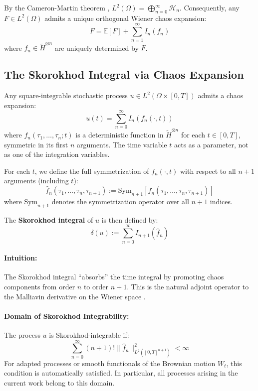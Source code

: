 \documentclass[11pt]{article}
\begin{document}
By the Cameron-Martin theorem \citep{cameron1944transformations}, $L^2(\Omega) = \bigoplus_{n=0}^{\infty} \mathcal{H}_n$. Consequently, any $F \in L^2(\Omega)$ admits a unique orthogonal Wiener chaos expansion:
\begin{equation}
    F = \mathbb{E}[F] + \sum_{n=1}^{\infty} I_n(f_n)
\end{equation}
where $f_n \in \tilde{H}^{\otimes n}$ are uniquely determined by $F$.

\subsection{The Skorokhod Integral via Chaos Expansion}\label{sec:Skorokhod}

Any square-integrable stochastic process $u \in L^2(\Omega \times [0,T])$ admits a chaos expansion:
\begin{equation}
    u(t) = \sum_{n=0}^{\infty} I_n(f_n(\cdot, t))
\end{equation}
where $f_n(\tau_1, \ldots, \tau_n; t)$ is a deterministic function in $\tilde{H}^{\otimes n}$ for each $t \in [0,T]$, symmetric in its first $n$ arguments. The time variable $t$ acts as a parameter, not as one of the integration variables.

For each $t$, we define the full symmetrization of $f_n(\cdot, t)$ with respect to all $n+1$ arguments (including $t$):
\begin{equation}
\hat{f}_n(\tau_1, \ldots, \tau_n, \tau_{n+1}) := \text{Sym}_{n+1} 
\left[f_n(\tau_1, \ldots, \tau_n, \tau_{n+1})\right]
\end{equation}
where $\text{Sym}_{n+1}$ denotes the symmetrization operator over all $n+1$ indices.

The \textbf{Skorokhod integral} of $u$ is then defined by:
\begin{equation}
    \delta(u) := \sum_{n=0}^{\infty} I_{n+1}(\hat{f}_n)
\end{equation}

\paragraph{Intuition:} The Skorokhod integral ``absorbs'' the time integral by promoting chaos components from order $n$ to order $n+1$. This is the natural adjoint operator to the Malliavin derivative on the Wiener space \citep{malliavin1978stochastic}.

\paragraph{Domain of Skorokhod Integrability:} The process $u$ is Skorokhod-integrable if:
\begin{equation}
    \sum_{n=0}^{\infty} (n+1)! \|\hat{f}_n\|^2_{L^2([0,T]^{n+1})} < \infty
\end{equation}
For adapted processes or smooth functionals of the Brownian motion $W_t$, this condition is automatically satisfied. In particular, all processes arising in the current work belong to this domain.
\end{document}
